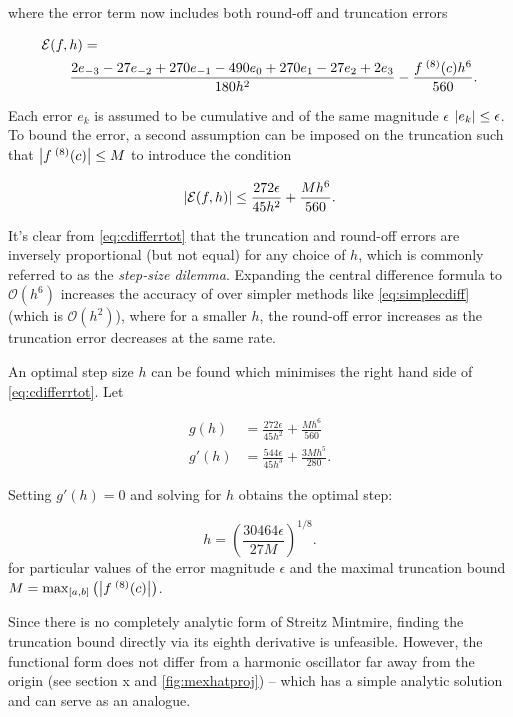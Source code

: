 where the error term now includes both round-off and truncation errors

{\mathindent=0.5cm
\begin{align}
\MoveEqLeft \mathcal{E}(f,h) = \nonumber\\
&\frac{2e_{-3}-27e_{-2}+270e_{-1}-490e_{0}+270e_{1}-27e_{2}+2e_{3}}{180h^{2}}-\frac{f^{\;(8)}(c)h^6}{560}.
\end{align}
}

Each error $e_k$ is assumed to be cumulative and of the same magnitude $\epsilon$ \ie $\left\lvert e_k\right\rvert \leq \epsilon$.
To bound the error, a second assumption can be imposed on the truncation such that $\left\lvert f^{\;(8)}(c)\right\rvert \leq M$ to introduce the condition

\begin{equation}
\left\lvert \mathcal{E}(f,h)\right\rvert \leq \frac{272\epsilon}{45h^2}+\frac{Mh^6}{560}.\label{eq:cdifferrtot}
\end{equation}

It's clear from \cref{eq:cdifferrtot} that the truncation and round-off errors are inversely proportional (but not equal) for any choice of $h$, which is commonly referred to as the \emph{step-size dilemma}.
Expanding the central difference formula to $\mathcal{O}(h^6)$ increases the accuracy of over simpler methods like \cref{eq:simplecdiff} (which is $\mathcal{O}(h^2)$), where for a smaller $h$, the round-off error increases as the truncation error decreases at the same rate.

An optimal step size $h$ can be found which minimises the right hand side of \cref{eq:cdifferrtot}. Let

\begin{align}
g(h) &= \frac{272\epsilon}{45h^2}+\frac{Mh^6}{560}\\[0.2cm]
g'(h) &= \frac{544\epsilon}{45h^3}+\frac{3Mh^5}{280}.
\end{align}

Setting $g'(h) = 0$ and solving for $h$ obtains the optimal step:

\begin{equation}
h = \left(\frac{30464\epsilon}{27M}\right)^{1/8}.\label{eq:stepgen}
\end{equation}
for particular values of the error magnitude $\epsilon$ and the maximal truncation bound $M = \mathrm{max}_{[a,b]}\left(\left\lvert f^{\;(8)}(c)\right\rvert\right)$.

Since there is no completely analytic form of Streitz Mintmire, finding the truncation bound directly via its eighth derivative is unfeasible.
However, the functional form does not differ from a harmonic oscillator far away from the origin (see section x and \cref{fig:mexhatproj}) -- which has a simple analytic solution and can serve as an analogue.

